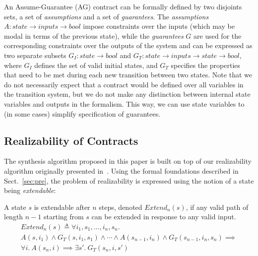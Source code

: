An Assume-Guarantee (AG) contract can be formally defined by two disjoints sets, a set of
\emph{assumptions} and a set of \emph{guarantees}. The \emph{assumptions} $A: state \rightarrow inputs \rightarrow bool$
impose constraints over the inputs (which may be modal in terms of the previous state), while the \emph{guarantees} $G$ are used for the corresponding constraints over the outputs of the system and can be expressed as
two separate subsets $G_I: state \rightarrow bool$ and $G_T: state \rightarrow inputs \rightarrow state \rightarrow bool$, where $G_I$ defines the set of valid
initial states, and $G_T$ specifies the properties that need to be met during
each new transition between two states. Note that we do not necessarily expect
that a contract would be defined over all variables in the transition system,
but we do not make any distinction between internal state variables and outputs in the formalism.
This way, we can use state variables to (in some cases) simplify specification of guarantees.

\subsection{Realizability of Contracts}
The synthesis algorithm proposed in this paper is built on top of our realizability algorithm
originally presented in~\cite{Katis15:Realizability}. Using the formal foundations described in Sect.~\ref{sec:pre},
the problem of realizability is expressed using the notion of a state being \emph{extendable}:

\begin{definition}
\label{def:extend}
A state $s$ is extendable after $n$ steps, denoted $\mathit{Extend}_{n}(s)$, if
any valid path of length $n-1$ starting from $s$ can be extended in response to
any valid input.%
%
\begin{multline*}%
\mathit{Extend}_{n}(s) \triangleq \forall i_1, s_1, \ldots, i_n, s_n.\\ A(s, i_1) \land G_T(s, i_1, s_1)
\land \cdots \land
A(s_{n-1}, i_n) \land G_T(s_{n-1}, i_n, s_n)
\implies \\
\forall i.~ A(s_n, i) \implies \exists s'.~ G_T(s_n, i, s')
\end{multline*}
\end{definition}

